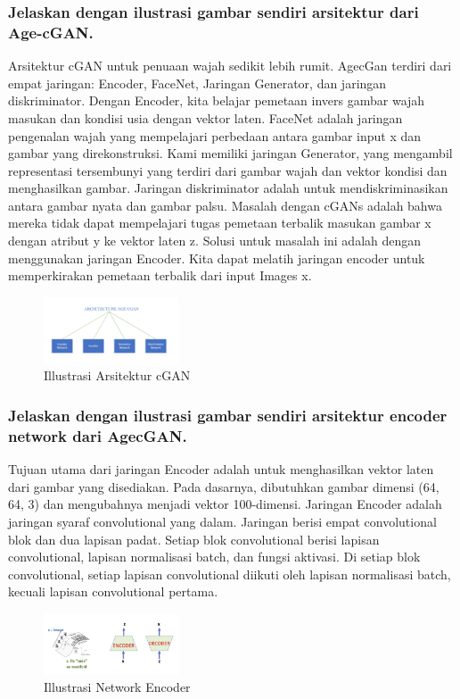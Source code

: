 \subsubsection{Jelaskan dengan ilustrasi gambar sendiri arsitektur dari Age-cGAN.}
\hfill \break
Arsitektur cGAN untuk penuaan wajah sedikit lebih rumit. AgecGan terdiri dari empat jaringan: Encoder, FaceNet, Jaringan Generator, dan jaringan diskriminator. Dengan Encoder, kita belajar pemetaan invers gambar wajah masukan dan kondisi usia dengan vektor laten. FaceNet adalah jaringan pengenalan wajah yang mempelajari perbedaan antara gambar input x dan gambar yang direkonstruksi. Kami memiliki jaringan Generator, yang mengambil representasi tersembunyi yang terdiri dari gambar wajah dan vektor kondisi dan menghasilkan gambar. Jaringan diskriminator adalah untuk mendiskriminasikan antara gambar nyata dan gambar palsu. Masalah dengan cGANs adalah bahwa mereka tidak dapat mempelajari tugas pemetaan terbalik masukan gambar x dengan atribut y ke vektor laten z. Solusi untuk masalah ini adalah dengan menggunakan jaringan Encoder. Kita dapat melatih jaringan encoder untuk memperkirakan pemetaan terbalik dari input Images x. 
	\begin{figure}[H]
    	\includegraphics[width=4cm]{figures/1174066/9/2.PNG}
    	\centering
    	\caption{Illustrasi Arsitektur cGAN}
	\end{figure}

\subsubsection{Jelaskan dengan ilustrasi gambar sendiri arsitektur encoder network dari AgecGAN.}
\hfill \break
Tujuan utama dari jaringan Encoder adalah untuk menghasilkan vektor laten dari gambar yang disediakan. Pada dasarnya, dibutuhkan gambar dimensi (64, 64, 3) dan mengubahnya menjadi vektor 100-dimensi. Jaringan Encoder adalah jaringan syaraf convolutional yang dalam. Jaringan berisi empat convolutional blok dan dua lapisan padat. Setiap blok convolutional berisi lapisan convolutional, lapisan normalisasi batch, dan fungsi aktivasi. Di setiap blok convolutional, setiap lapisan convolutional diikuti oleh lapisan normalisasi batch, kecuali lapisan convolutional pertama. 
	\begin{figure}[H]
		\includegraphics[width=4cm]{figures/1174066/9/3.jpg}
		\centering
		\caption{Illustrasi Network Encoder}
	\end{figure}
	
